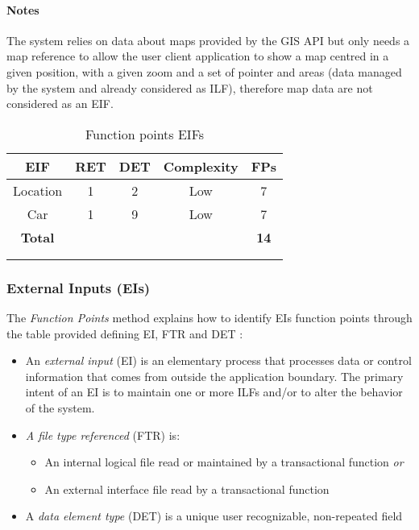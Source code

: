 \paragraph{Notes} The system relies on data about maps provided by the GIS API but only needs a map reference to allow the user client application to show a map centred in a given position, with a given zoom and a set of pointer and areas (data managed by the system and already considered as ILF), therefore map data are not considered as an EIF.

\begin{longtable}{ccccc}
\toprule
\textbf{EIF}			&	RET	&	DET	&	Complexity  & \textbf{FPs}\\
\midrule
Location			&	1	&	2		&	Low & 7 \\
Car & 1 & 9 & Low & 7 \\
\midrule
\textbf{Total} & & & & \textbf{14}\\
\bottomrule \\
\caption{Function points EIFs}
\label{tbl:eifFP}
\end{longtable}

\clearpage

\subsubsection{External Inputs (EIs)}
\label{sec:EIs}

The \emph{Function Points} method explains how to identify EIs function points through the table provided defining EI, FTR and DET \cite{FP}:
\begin{itemize}
	\item An \emph{external input} (EI) is an elementary process that processes data or control information that comes from outside the application boundary. The primary intent of an EI is to maintain one or more ILFs and/or to alter the behavior of the system.
	\item \emph{A file type referenced} (FTR) is:
	\begin{itemize}
 		\item An internal logical file read or maintained by a transactional function \emph{or}
 		\item An external interface file read by a transactional function
	\end{itemize}
	\item A \emph{data element type} (DET) is a unique user recognizable, non-repeated field
\end{itemize} 


